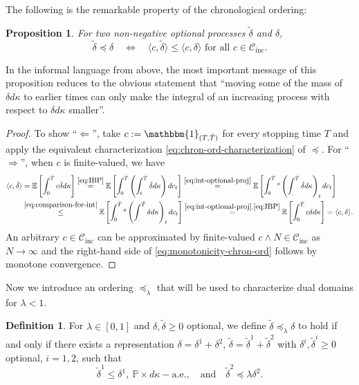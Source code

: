 \documentclass[11pt, oneside]{article}   	%
\theoremstyle{plain}
\newtheorem{prop}[thm]{Proposition}
\theoremstyle{definition}
\newtheorem{defn}[thm]{Definition}
\theoremstyle{remark}
\begin{document}
The following is the remarkable property of the chronological ordering:
\begin{prop}\label{prop:remarkable-property}
For two non-negative optional processes $\tilde{\delta}$ and $\delta$,
\begin{equation}\label{eq:monotonicity-chron-ord}
\tilde{\delta}\preceq\delta\quad \Leftrightarrow\quad \langle c,\tilde\delta\rangle\leq\langle c,\delta \rangle\text{ for all }c\in\mathcal{C}_{\text{inc}}.
\end{equation}
\end{prop}
In the informal language from above, the most important message of this proposition reduces to the obvious statement that ``moving some of the mass of $\delta d\kappa$ to earlier times can only make the integral of an increasing process with respect to $\delta d\kappa$ smaller''.
\begin{proof}
To show ``$\Leftarrow$'', take $c:=\mathbbm{1}_{(T,{\hat{T}})}$ for every stopping time $T$ and apply the equivalent characterization \eqref{eq:chron-ord-characterization} of $\preceq$. For ``$\Rightarrow$'', when $c$ is finite-valued, we have
\begin{equation*}
\begin{aligned}
\langle c,\tilde\delta\rangle&=\mathbb{E}\left[\int_0^{\hat{T}} c\tilde{\delta} d\kappa\right]\overset{\eqref{eq:IBP}}{=}\mathbb{E}\left[\int_0^{\hat{T}}\left(\int_t^{\hat{T}} \tilde{\delta} d\kappa\right)dc_t\right]\overset{\eqref{eq:int-optional-proj}}{=}\mathbb{E}\left[\int_0^{\hat{T}} {}^o\left(\int_.^{\hat{T}} \tilde{\delta} d\kappa\right)_tdc_t\right]\\
&\overset{\eqref{eq:comparison-for-int}}{\leq}\mathbb{E}\left[\int_0^{\hat{T}} {}^o\left(\int_.^{\hat{T}} \delta d\kappa\right)_tdc_t\right]\overset{\eqref{eq:int-optional-proj},\eqref{eq:IBP}}{=}\mathbb{E}\left[\int_0^{\hat{T}} c\delta d\kappa\right]=\langle c,\delta\rangle.
\end{aligned}
\end{equation*}
An arbitrary $c\in\mathcal{C}_{\text{inc}}$ can be approximated by finite-valued $c\wedge N\in\mathcal{C}_{\text{inc}}$ as $N\to\infty$ and the right-hand side of \eqref{eq:monotonicity-chron-ord} follows by monotone convergence.
\end{proof}
Now we introduce an ordering $\preceq_\lambda$ that will be used to characterize dual domains for $\lambda<1$.
\begin{defn}\label{def:lambda-ordering}
For $\lambda\in[0,1]$ and $\delta,\tilde\delta\geq 0$ optional, we define $\tilde\delta\preceq_\lambda\delta$ to hold if and only if there exists a representation
$\delta=\delta^1+\delta^2$, $\tilde\delta=\tilde\delta^1+\tilde\delta^2$ with $\delta^i,\tilde\delta^i\geq 0$ optional, $i=1,2$, such that
$$\tilde\delta^1\leq\delta^1,\ \mathbb{P}\times d\kappa-\text{a.e.},\quad\text{and}\quad\tilde\delta^2\preceq\lambda\delta^2.$$
\end{defn}
\end{document}
